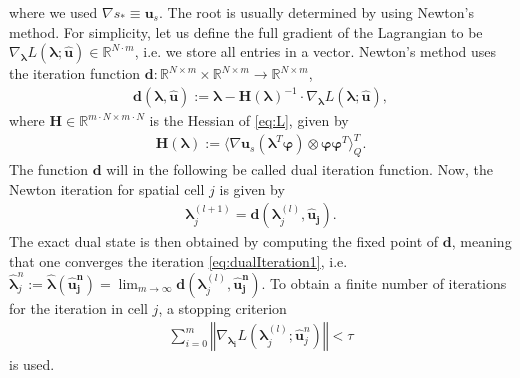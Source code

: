 where we used $\nabla s_* \equiv \bm u_s$. The root is usually determined by using Newton's method. For simplicity, let us define the full gradient of the Lagrangian to be $\nabla_{\bm{\lambda}}L(\bm{\lambda};\bm{\hat{u}})\in\mathbb{R}^{N\cdot m}$, i.e. we store all entries in a vector. Newton's method uses the iteration function $\bm{d}:\mathbb{R}^{N\times m}\times\mathbb{R}^{N\times m}\to\mathbb{R}^{N\times m}$,
\begin{align}\label{eq:dualIterationFunction}
\bm{d}(\bm{\lambda},\bm{\hat{u}}):= \bm{\lambda}-\bm{H}(\bm{\lambda})^{-1}\cdot\nabla_{\bm{\lambda}}L(\bm{\lambda};\bm{\hat{u}}),
\end{align}
where $\bm H\in\mathbb{R}^{m \cdot  N\times m\cdot N}$ is the Hessian of \eqref{eq:L}, given by
\begin{align*}
\bm{H}(\bm{\lambda}) := \langle \nabla \bm{u}_{s} (\bm{\lambda}^T\bm{\varphi})\otimes\bm{\varphi}\bm{\varphi}^T\rangle_Q^{T}.
\end{align*}
The function $\bm d$ will in the following be called dual iteration function. Now, the Newton iteration for spatial cell $j$ is given by
\begin{align}\label{eq:dualIteration1}
\bm{\lambda}^{(l+1)}_j = \bm{d}(\bm{\lambda}_j^{(l)},\bm{\hat{u}_j}).
\end{align}
The exact dual state is then obtained by computing the fixed point of $\bm{d}$, meaning that one converges the iteration \eqref{eq:dualIteration1}, i.e. $\bm{\hat\lambda}_j^n:=\bm{\hat\lambda}(\bm{\hat u_j^n})=\lim_{m\rightarrow\infty}\bm{d}(\bm{\lambda}_j^{(l)},\bm{\hat{u}_j^n})$.
To obtain a finite number of iterations for the iteration in cell $j$, a stopping criterion 
\begin{align}\label{eq:tauCrit}
\sum_{i=0}^m\left\Vert \nabla_{\bm{\lambda_i}}L(\bm{\lambda}_j^{(l)};\bm{\hat{u}}_j^n) \right\Vert < \tau
\end{align}
is used.

